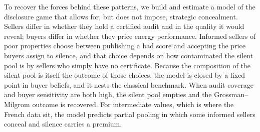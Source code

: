 To recover the forces behind these patterns, we build and estimate a model of the disclosure
game that allows for, but does not impose, strategic concealment. Sellers differ in whether they
hold a certified audit and in the quality it would reveal; buyers differ in whether they price
energy performance. Informed sellers of poor properties choose between publishing a bad score
and accepting the price buyers assign to silence, and that choice depends on how contaminated
the silent pool is by sellers who simply have no certificate. Because the composition of the
silent pool is itself the outcome of those choices, the model is closed by a fixed point in
buyer beliefs, and it nests the classical benchmark. When audit coverage and buyer sensitivity
are both high, the silent pool empties and the Grossman--Milgrom outcome is recovered. For
intermediate values, which is where the French data sit, the model predicts partial pooling in
which some informed sellers conceal and silence carries a premium.
